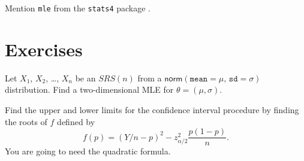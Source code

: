 Mention \texttt{mle} from the \texttt{stats4} package \cite{stats4}.

\newpage{}

\section{Exercises}
\label{sec-9-9}
\setcounter{thm}{0}

\begin{xca}
\label{xca-norm-mu-sig-MLE} Let \(X_{1}\), \(X_{2}\), \ldots{}, \(X_{n}\) be an
\(SRS(n)\) from a \(\mathsf{norm}(\mathtt{mean} = \mu, \, \mathtt{sd}
= \sigma)\) distribution. Find a two-dimensional MLE for
\(\theta=(\mu,\sigma)\).
\end{xca}

\begin{xca}
\label{xca-CI-quad-form} Find the upper and lower limits for the
confidence interval procedure by finding the roots of \(f\) defined by
\[ f(p)=\left(Y/n-p\right)^{2}-z_{\alpha/2}^{2}\frac{p(1-p)}{n}.  \]
You are going to need the quadratic formula.
\end{xca}
